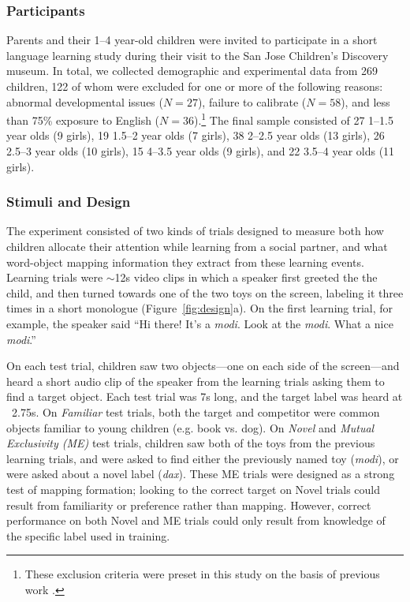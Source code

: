 \documentclass[man,floatsintext]{apa6}
\begin{document}
\subsubsection{Participants}

Parents and their 1--4 year-old children were invited to participate in a short language learning study during their visit to the San Jose Children's Discovery museum. In total, we collected demographic and experimental data from 269 children, 122 of whom were excluded for one or more of the following reasons: abnormal developmental issues ($N= 27$), failure to calibrate ($N=58$), and less than 75\% exposure to English ($N=36$).\footnote{These exclusion criteria were preset in this study on the basis of previous work \cite{Yurovsky2013c}.} The final sample consisted of 27 1--1.5 year olds (9 girls), 19 1.5--2 year olds (7 girls), 38 2--2.5 year olds (13 girls), 26 2.5--3 year olds (10 girls), 15 4--3.5 year olds (9 girls), and 22 3.5--4 year olds (11 girls).

\subsubsection{Stimuli and Design}

The experiment consisted of two kinds of trials designed to measure both how children allocate their attention while learning from a social partner, and what word-object mapping information they extract from these learning events. Learning trials were $\sim$12s video clips in which a speaker first greeted the the child, and then turned towards one of the two toys on the screen, labeling it three times in a short monologue (Figure~\ref{fig:design}a). On the first learning trial, for example, the speaker said ``Hi there! It's a \emph{modi}. Look at the \emph{modi}. What a nice \emph{modi}.''

On each test trial, children saw two objects---one on each side of the screen---and heard a short audio clip of the speaker from the learning trials asking them to find a target object. Each test trial was 7s long, and the target label was heard at ~2.75s. On \emph{Familiar} test trials, both the target and competitor were common objects familiar to young children (e.g. book vs. dog). On \emph{Novel} and  \emph{Mutual Exclusivity (ME)} test trials, children saw both of the toys from the previous learning trials, and were asked to find either the previously named toy (\emph{modi}), or were asked about a novel label (\emph{dax}). These ME trials were designed as a strong test of mapping formation; looking to the correct target on Novel trials could result from familiarity or preference rather than mapping. However, correct performance on both Novel and ME trials could only result from knowledge of the specific label used in training.
\end{document}
